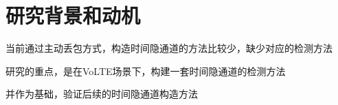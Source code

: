 \section{研究背景和动机}
\label{chap:analyze:motivation}

当前通过主动丢包方式，构造时间隐通道的方法比较少，缺少对应的检测方法

研究的重点，是在VoLTE场景下，构建一套时间隐通道的检测方法

并作为基础，验证后续的时间隐通道构造方法
